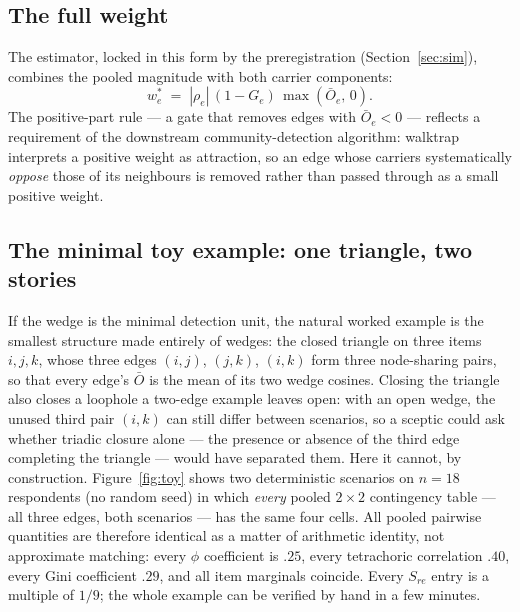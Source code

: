 \documentclass[11pt]{article}
\newcommand{\Obar}{\bar{O}}
\newcommand{\wstar}{w^{*}}
\begin{document}
\subsection{The full weight}
The estimator, locked in this form by the preregistration
(Section~\ref{sec:sim}), combines the pooled magnitude with both carrier
components:
\begin{equation}
\wstar_e \;=\; |\rho_e|\,(1-G_e)\,\max(\Obar_e,\,0).
\label{eq:cw}
\end{equation}
The positive-part rule --- a gate that removes edges with $\Obar_e<0$ ---
reflects a requirement of the downstream community-detection algorithm:
walktrap \citep{pons2006} interprets a positive weight as attraction, so an
edge whose carriers systematically \emph{oppose} those of its neighbours is
removed rather than passed through as a small positive weight.

\subsection{The minimal toy example: one triangle, two stories}\label{sec:toy}
If the wedge is the minimal detection unit, the natural worked example is
the smallest structure made entirely of wedges: the closed triangle on
three items $i,j,k$, whose three edges $(i,j)$, $(j,k)$, $(i,k)$ form
three node-sharing pairs, so that every edge's $\Obar$ is
the mean of its two wedge cosines. Closing the triangle also closes a
loophole a two-edge example leaves open: with an open wedge, the unused
third pair $(i,k)$ can still differ between scenarios, so a sceptic could
ask whether triadic closure alone --- the presence or absence of the third
edge completing the triangle --- would have separated them. Here it
cannot, by construction. Figure~\ref{fig:toy} shows two deterministic
scenarios on $n=18$ respondents (no random seed) in which \emph{every}
pooled $2\times2$ contingency table --- all three edges, both scenarios ---
has the same four cells. All pooled pairwise quantities are therefore
identical as a matter of arithmetic identity, not approximate matching:
every $\phi$ coefficient is $.25$, every tetrachoric correlation $.40$,
every Gini coefficient $.29$, and all item marginals coincide. Every $S_{re}$ entry is a multiple of $1/9$;
the whole example can be verified by hand in a few minutes.
\end{document}
